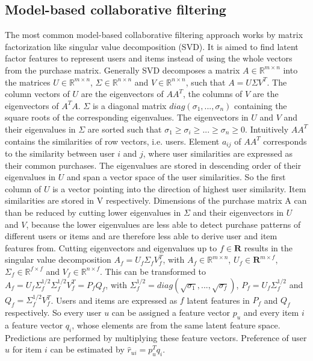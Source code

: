 \documentclass[10pt]{reportMaster}
\begin{document}
\subsection{Model-based collaborative filtering}
The most common model-based collaborative filtering approach works by matrix factorization like singular value decomposition (SVD).
It is aimed to find latent factor features to represent users and items instead of using the whole vectors from the purchase matrix.
Generally SVD decomposes a matrix $A \in \mathds{R}^{m \times n}$ into the matrices $U \in \mathds{R}^{m \times n}$, $\Sigma \in \mathds{R}^{n \times n}$ and $V \in \mathds{R}^{n \times n}$, such that $A = U \Sigma V^T$.
The column vectors of $U$ are the eigenvectors of $AA^T$, the columns of $V$ are the eigenvectors of $A^TA$.
$\Sigma$ is a diagonal matrix $diag(\sigma_1, ..., \sigma_n)$ containing the square roots of the corresponding eigenvalues.  %
The eigenvectors in $U$ and $V$ and their eigenvalues in $\Sigma$ are sorted such that $\sigma_1 \geq \sigma_i \geq ... \geq \sigma_n \geq 0$.
Intuitively $AA^T$ contains the similarities of row vectors, i.e. users.
Element $a_{ij}$ of $AA^T$ corresponds to the similarity between user $i$ and $j$, where user similarities are expressed as their common purchases.
The eigenvalues are stored in descending order of their eigenvalues in $U$ and span a vector space of the user similarities.
So the first column of $U$ is a vector pointing into the direction of highest user similarity. %
Item similarities are stored in V respectively.
Dimensions of the purchase matrix A can than be reduced by cutting lower eigenvalues in $\Sigma$ and their eigenvectors in $U$ and $V$, because the lower eigenvalues are less able to detect purchase patterns of different users or items and are therefore less able to derive user and item features from.
Cutting eigenvectors and eigenvalues up to $f \in \mathbf{R}$ results in the singular value decomposition $A_f = U_f \Sigma_f V_f^T$, with $A_f \in \mathds{R}^{m \times n}$, $U_f \in \mathbf{R}^{m \times f}$, $\Sigma_f \in \mathds{R}^{f \times f}$ and $V_f \in \mathds{R}^{n \times f}$.
This can be transformed to $A_f = U_f \Sigma_f^{1/2} \Sigma_f^{1/2} V_f^T = P_f Q_f$, with $\Sigma_f^{1/2} = diag(\sqrt{\sigma_1}, ..., \sqrt{\sigma_f})$, $P_f = U_f \Sigma_f^{1/2}$ and $Q_f = \Sigma_f^{1/2} V_f^T$.
Users and items are expressed as $f$ latent features in $P_f$ and $Q_f$ respectively.
So every user $u$ can be assigned a feature vector $p_u$ and every item $i$ a feature vector $q_i$, whose elements are from the same latent feature space.
Predictions are performed by multiplying these feature vectors.
Preference of user $u$ for item $i$ can be estimated by $\hat{r}_{ui} = p_u^T q_i$.
\end{document}

